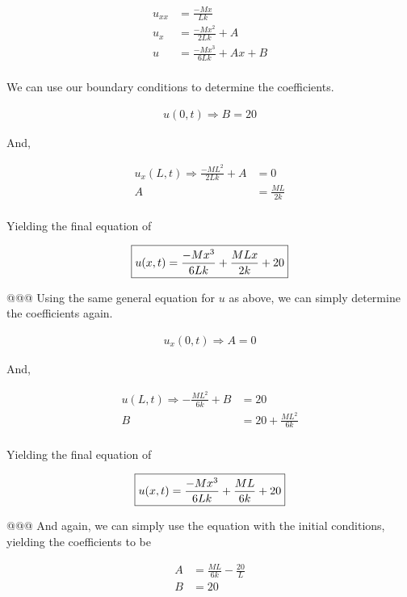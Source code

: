 \documentclass[10pt]{article}
\begin{document}
\begin{easylist}[enumerate]
    \begin{align*}
        u_{xx} &= \frac{-Mx}{Lk}\\
        u_x &= \frac{-Mx^2}{2Lk} + A\\
        u &= \frac{-Mx^3}{6Lk} + Ax + B\\
    \end{align*}

    We can use our boundary conditions to determine the coefficients.

    \begin{align*}
        u(0, t) \Rightarrow B = 20
    \end{align*}

    And,

    \begin{align*}
        u_x(L, t) \Rightarrow \frac{-ML^2}{2Lk} + A &= 0\\
         A &= \frac{ML}{2k}\\
    \end{align*}

    Yielding the final equation of

    \[
        \boxed{%
            u(x, t) = \frac{-Mx^3}{6Lk} + \frac{MLx}{2k} + 20\\
        }
    \]

    @@@ Using the same general equation for $u$ as above, we can simply determine the coefficients again.

    \begin{align*}
        u_x(0,t) \Rightarrow A = 0
    \end{align*}

    And,

    \begin{align*}
        u(L,t) \Rightarrow -\frac{ML^2}{6k} + B &= 20\\
        B &= 20 + \frac{ML^2}{6k}\\
    \end{align*}

    Yielding the final equation of

    \[
        \boxed{%
            u(x, t) = \frac{-Mx^3}{6Lk} + \frac{ML}{6k} + 20\\
        }
    \]

    @@@ And again, we can simply use the equation with the initial conditions, yielding the coefficients to be

    \begin{align*}
        A &= \frac{ML}{6k} - \frac{20}{L}\\
        B&=20
    \end{align*}


\end{easylist}
\end{document}
